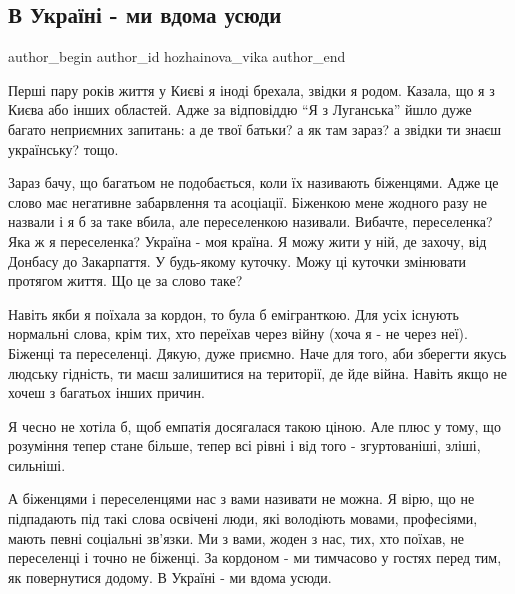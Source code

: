  
 
 
 
 
 
\subsection{В Україні - ми вдома усюди}
\label{sec:06_03_2022.fb.hozhainova_vika.1.v_ukraini_my_vdoma_usjudy}
 
\ifcmt
 author_begin
   author_id hozhainova_vika
 author_end
\fi

Перші пару років життя у Києві я іноді брехала, звідки я родом. Казала, що я з
Києва або інших областей. Адже за відповіддю \enquote{Я з Луганська} йшло дуже багато
неприємних запитань: а де твої батьки? а як там зараз? а звідки ти знаєш
українську? тощо.

Зараз бачу, що багатьом не подобається, коли їх називають біженцями. Адже це
слово має негативне забарвлення та асоціації. Біженкою мене жодного разу не
назвали і я б за таке вбила, але переселенкою називали. Вибачте, переселенка?
Яка ж я переселенка? Україна - моя країна. Я можу жити у ній, де захочу, від
Донбасу до Закарпаття. У будь-якому куточку. Можу ці куточки змінювати протягом
життя. Що це за слово таке?

Навіть якби я поїхала за кордон, то була б емігранткою. Для усіх існують
нормальні слова, крім тих, хто переїхав через війну (хоча я - не через неї).
Біженці та переселенці. Дякую, дуже приємно. Наче для того, аби зберегти якусь
людську гідність, ти маєш залишитися на території, де йде війна. Навіть якщо не
хочеш з багатьох інших причин.

Я чесно не хотіла б, щоб емпатія досягалася такою ціною. Але плюс у тому, що
розуміння тепер стане більше, тепер всі рівні і від того - згуртованіші, зліші,
сильніші.

А біженцями і переселенцями нас з вами називати не можна. Я вірю, що не
підпадають під такі слова освічені люди, які володіють мовами, професіями,
мають певні соціальні зв'язки. Ми з вами, жоден з нас, тих, хто поїхав, не
переселенці і точно не біженці. За кордоном - ми тимчасово у гостях перед тим,
як повернутися додому. В Україні - ми вдома усюди.

